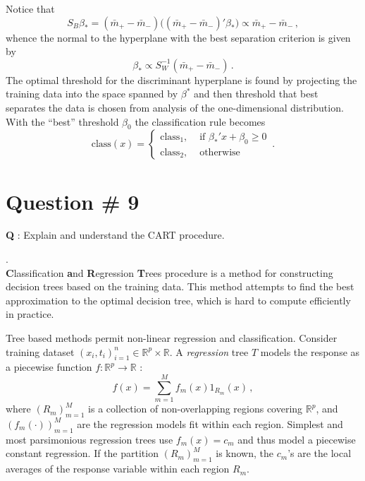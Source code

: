 \documentclass[a4paper]{article}
\newcommand{\Real}{\mathbb{R}}
\begin{document}
Notice that
\[
S_B \beta_* = (\bar{m}_+ - \bar{m}_-) \bigl( (\bar{m}_+ - \bar{m}_-)'\beta_* \bigr)
\propto \bar{m}_+ - \bar{m}_-\,,
\]
whence the normal to the hyperplane with the best separation criterion is given by
\[ \beta_* \propto S_W^{-1} (\bar{m}_+ - \bar{m}_-) \,. \]
The optimal threshold for the discriminant hyperplane is found by projecting the 
training data into the space spanned by $\beta^*$ and then threshold that best
separates the data is chosen from analysis of the one-dimensional distribution.
With the ``best'' threshold $\beta_0$ the classification rule becomes
\[\text{class}(x) = \begin{cases}
	\text{class}_1, &\text{ if } \beta_*' x + \beta_0 \geq 0\\
	\text{class}_2, &\text{ otherwise }
\end{cases}\,.\]

\clearpage

\section[CART]{Question \# 9} %
\label{sec:question_9}
\textbf{\large \textbf{Q}} : Explain and understand the CART procedure.

 .\hfill\\
\textbf{C}lassification \textbf{a}nd \textbf{R}egression \textbf{T}rees procedure
is a method for constructing decision trees based on the training data. This method
attempts to find the best approximation to the optimal decision tree, which is hard
to compute efficiently in practice.

Tree based methods permit non-linear regression and classification. Consider training
dataset $(x_i,t_i)_{i=1}^n\in \Real^p \times \Real$. A \emph{regression} tree $T$
models the response as a piecewise function $f:\Real^p \to \Real$ :
\[ f(x) = \sum_{m=1}^M f_m(x) 1_{R_m}(x)\,, \]
where $(R_m)_{m=1}^M$ is a collection of non-overlapping regions covering $\Real^p$, 
and $(f_m(\cdot))_{m=1}^M$ are the regression models fit within each region. Simplest
and most parsimonious regression trees use $f_m(x) = c_m$ and thus model a piecewise
constant regression. If the partition $(R_m)_{m=1}^M$ is known, the $c_m$'s are the
local averages of the response variable within each region $R_m$.
\end{document}
